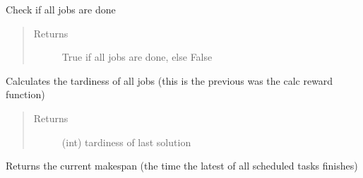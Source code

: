 \documentclass[letterpaper,10pt,english]{sphinxmanual}
\begin{document}
\begin{fulllineitems}
\begin{fulllineitems}
\label{\detokenize{environments:environments.env_tetris_scheduling.Env.check_done}}
\sphinxAtStartPar
Check if all jobs are done
\begin{quote}\begin{description}
\item[{Returns}] \leavevmode
\sphinxAtStartPar
True if all jobs are done, else False

\end{description}\end{quote}

\end{fulllineitems}


\begin{fulllineitems}
\label{\detokenize{environments:environments.env_tetris_scheduling.Env.calculate_tardiness}}
\sphinxAtStartPar
Calculates the tardiness of all jobs
(this is the previous was the calc reward function)
\begin{quote}\begin{description}
\item[{Returns}] \leavevmode
\sphinxAtStartPar
(int) tardiness of last solution

\end{description}\end{quote}

\end{fulllineitems}


\begin{fulllineitems}
\label{\detokenize{environments:environments.env_tetris_scheduling.Env.get_makespan}}
\sphinxAtStartPar
Returns the current makespan (the time the latest of all scheduled tasks finishes)

\end{fulllineitems}


\end{fulllineitems}
\end{document}
